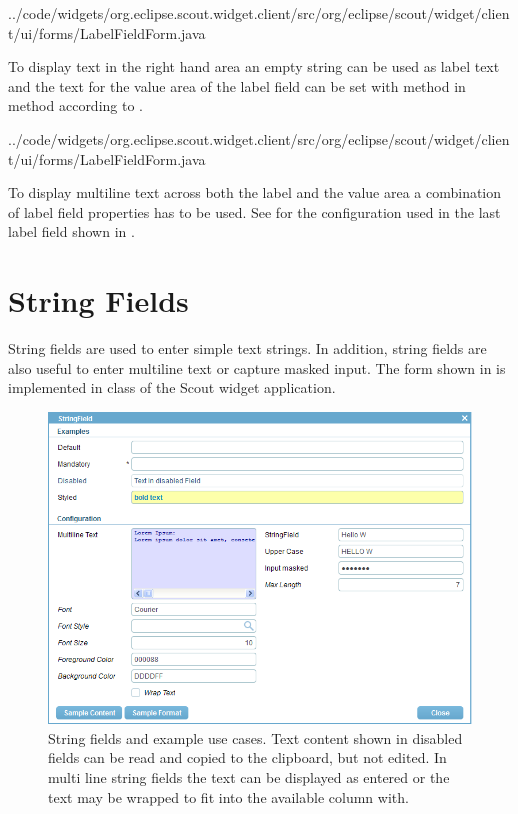 \documentclass[a4paper,10pt,twoside]{book}
\begin{document}
{
{../code/widgets/org.eclipse.scout.widget.client/src/org/eclipse/scout/widget/client/ui/forms/LabelFieldForm.java}

To display text in the right hand area an empty string can be used as label text and the text for the value area of the label field can be set with method  in method  according to .


{../code/widgets/org.eclipse.scout.widget.client/src/org/eclipse/scout/widget/client/ui/forms/LabelFieldForm.java}

To display multiline text across both the label and the value area a combination of label field properties has to be used.
See  for the configuration used in the last label field shown in .

\section{String Fields}

String fields are used to enter simple text strings. 
In addition, string fields are also useful to enter multiline text or capture masked input.
The form shown in  is implemented in class  of the Scout widget application.

\begin{figure}
\includegraphics[width=15cm]{stringfield.png}
\caption{String fields and example use cases.
Text content shown in disabled fields can be read and copied to the clipboard, but not edited.
In multi line string fields the text can be displayed as entered or the text may be wrapped to fit into the available column with.}
\end{figure}

}
\end{document}
